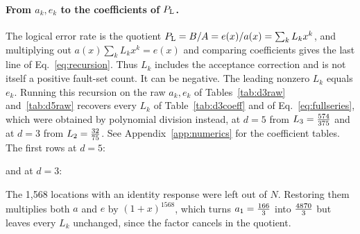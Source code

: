 \paragraph{From $a_k,e_k$ to the coefficients of $P_{\mathrm L}$.} The logical error rate is the quotient $P_{\mathrm L}=B/A=e(x)/a(x)=\sum_kL_kx^k$, and multiplying out $a(x)\sum_kL_kx^k=e(x)$ and comparing coefficients gives the last line of Eq.~\eqref{eq:recursion}. Thus $L_k$ includes the acceptance correction and is not itself a positive fault-set count. It can be negative. The leading nonzero $L_k$ equals $e_k$. Running this recursion on the raw $a_k,e_k$ of Tables~\ref{tab:d3raw} and~\ref{tab:d5raw} recovers every $L_k$ of Table~\ref{tab:d3coeff} and of Eq.~\eqref{eq:fullseries}, which were obtained by polynomial division instead, at $d=5$ from $L_{3}=\frac{574}{375}$ and at $d=3$ from $L_{2}=\frac{32}{75}$. See Appendix~\ref{app:numerics} for the coefficient tables. The first rows at $d=5$:
{\color{black}
\begin{center}\small\end{center}}
and at $d=3$:
{\color{black}
\begin{center}\small\end{center}}
The 1,568 locations with an identity response were left out of $N$. Restoring them multiplies both $a$ and $e$ by $(1+x)^{1568}$, which turns $a_1=\frac{166}{3}$ into $\frac{4870}{3}$ but leaves every $L_k$ unchanged, since the factor cancels in the quotient.


